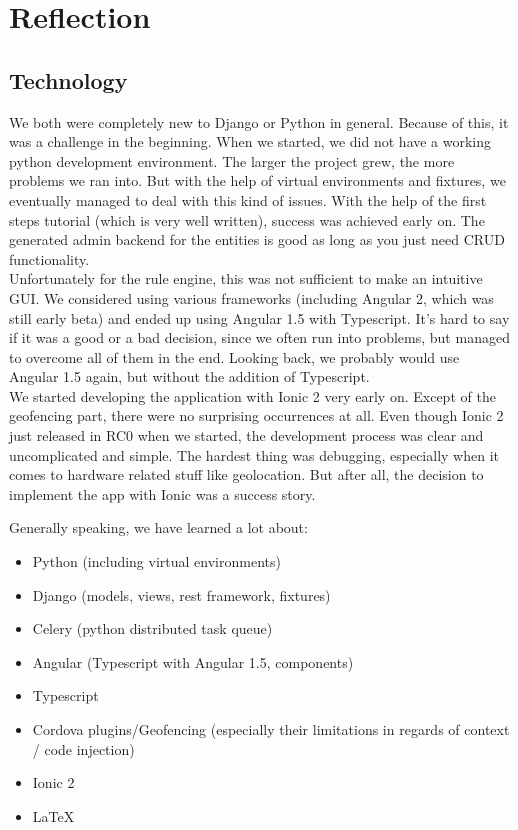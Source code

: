 \documentclass[11pt]{article} %
\begin{document}
\newpage
\section{Reflection}
\subsection{Technology}
We both were completely new to Django or Python in general. Because of this, it was a challenge in the beginning. When we started, we did not have a working python development environment. The larger the project grew, the more problems we ran into. But with the help of virtual environments and fixtures, we eventually managed to deal with this kind of issues. With the help of the first steps tutorial (which is very well written), success was achieved early on. The generated admin backend for the entities is good as long as you just need CRUD functionality.\\

Unfortunately for the rule engine, this was not sufficient to make an intuitive GUI. We considered using various frameworks (including Angular 2, which was still early beta) and ended up using Angular 1.5 with Typescript. It's hard to say if it was a good or a bad decision, since we often run into problems, but managed to overcome all of them in the end. Looking back, we probably would use Angular 1.5 again, but without the addition of Typescript.\\

We started developing the application with Ionic 2 very early on. Except of the geofencing part, there were no surprising occurrences at all. Even though Ionic 2  just released in RC0 when we started, the development process was clear and uncomplicated and simple. The hardest thing was debugging, especially when it comes to hardware related stuff like geolocation. But after all, the decision to implement the app with Ionic was a success story.

Generally speaking, we have learned a lot about:

\begin{itemize}
  \item Python (including virtual environments)
  \item Django (models, views, rest framework, fixtures)
  \item Celery (python distributed task queue)
  \item Angular (Typescript with Angular 1.5, components)
  \item Typescript
  \item Cordova plugins/Geofencing (especially their limitations in regards of context / code injection)
  \item Ionic 2
  \item LaTeX
\end{itemize}
\end{document}
